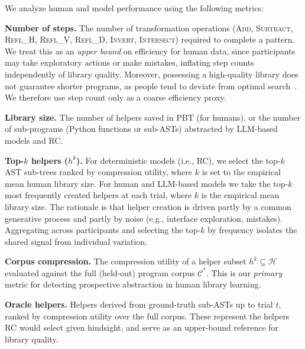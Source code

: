 \documentclass{article}
\begin{document}
We analyze human and model performance using the following metrics:

\textbf{Number of steps.} The number of transformation operations (\textsc{Add, Subtract, Refl\_H, Refl\_V, Refl\_D, Invert, Intersect}) required to complete a pattern. We treat this as an \emph{upper bound} on efficiency for human data, since participants may take exploratory actions or make mistakes, inflating step counts independently of library quality. Moreover, possessing a high-quality library does not guarantee shorter programs, as people tend to deviate from optimal search~\cite{kryven2024approximate}. We therefore use step count only as a coarse efficiency proxy.

\textbf{Library size.} The number of helpers saved in PBT (for humans), or the number of sub-programs (Python functions or sub-ASTs) abstracted by LLM-based models and RC.

\textbf{Top-$k$ helpers ($h^k$).} For deterministic models (i.e., RC), we select the top-$k$ AST sub-trees ranked by compression utility, where $k$ is set to the empirical mean human library size. For human and LLM-based models we take the top-$k$ most frequently created helpers at each trial, where $k$ is the empirical mean library size. The rationale is that helper creation is driven partly by a common generative process and partly by noise (e.g., interface exploration, mistakes). Aggregating across participants and selecting the top-$k$ by frequency isolates the shared signal from individual variation.

\textbf{Corpus compression.} The compression utility of a helper subset $h^k \subseteq \mathcal{H}$ evaluated against the full (held-out) program corpus $\mathcal{C}^*$. This is our \emph{primary} metric for detecting prospective abstraction in human library learning.

\textbf{Oracle helpers.} Helpers derived from ground-truth sub-ASTs up to trial $t$, ranked by compression utility over the full corpus. These represent the helpers RC would select given hindsight, and serve as an upper-bound reference for library quality.

\end{document}
